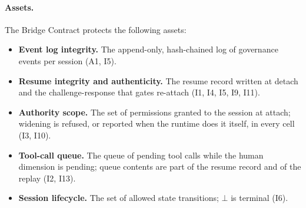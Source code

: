 \paragraph{Assets.} The Bridge Contract protects the following
assets:
\begin{itemize}[leftmargin=2em]
\item \textbf{Event log integrity.} The append-only, hash-chained
log of governance events per session (A1, I5).
\item \textbf{Resume integrity and authenticity.} The resume record
written at detach and the challenge-response that gates re-attach (I1,
I4, I5, I9, I11).
\item \textbf{Authority scope.} The set of permissions granted to
the session at attach; widening is refused, or reported when the runtime does it itself, in every cell (I3, I10).
\item \textbf{Tool-call queue.} The queue of pending tool calls
while the human dimension is pending; queue contents are part of the resume
record and of the replay (I2, I13).
\item \textbf{Session lifecycle.} The set of allowed state
transitions; $\bot$ is terminal (I6).
\end{itemize}

